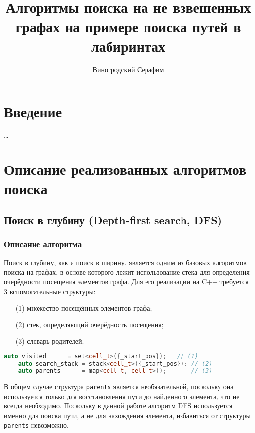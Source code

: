 \documentclass[a4paper, 12pt]{article}
\title{Алгоритмы поиска на не взвешенных графах на примере поиска путей в лабиринтах}
\author{Виногродский Серафим}
\begin{document}
\begin{titlepage}
    \maketitle
    \tableofcontents
    \thispagestyle{empty}
\end{titlepage}

\section{Введение}
\ldots

\section{Описание реализованных алгоритмов поиска}
\subsection{Поиск в глубину (Depth-first search, DFS)}
\subsubsection{Описание алгоритма}

Поиск в глубину, как и поиск в ширину, является одним из базовых алгоритмов поиска на графах, в основе которого лежит использование стека для определения очерёдности посещения элементов графа. Для его реализации на C++ требуется 3 вспомогательные структуры:
\begin{itemize}
    \item[(1)] множество посещённых элементов графа;
    \item[(2)] стек, определяющий очерёдность посещения;
    \item[(3)] словарь родителей.
\end{itemize}

\begin{lstlisting}[language=C++]
    auto visited      = set<cell_t>({_start_pos});   // (1)
    auto search_stack = stack<cell_t>({_start_pos}); // (2)
    auto parents      = map<cell_t, cell_t>();       // (3)
\end{lstlisting}

В общем случае структура \verb|parents| является необязательной, поскольку она используется только для восстановления пути до найденного элемента, что не всегда необходимо. Поскольку в данной работе алгоритм DFS используется именно для поиска пути, а не для нахождения элемента, избавиться от структуры \verb|parents| невозможно.
\end{document}
